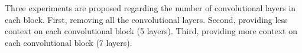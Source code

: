 
Three experiments are proposed regarding the number of
convolutional layers in each block. First, removing all the
convolutional layers. Second, providing less context on each
convolutional block (5 layers). Third, providing more
context on each convolutional block (7 layers).

